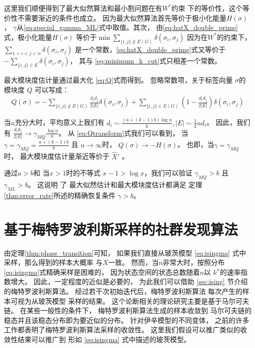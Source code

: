 这里我们顺便得到了最大似然算法和最小割问题在有$W^*$约束
下的等价性，这个等价性不需要渐近的条件也成立。
因为最大似然算法首先等价于极小化能量$H(\sigma)$，
$\gamma$从\eqref{eq:special_gamma_ML}式中取值。其次，
由\eqref{eq:hatX_double_prime}式，极小化能量$H(\sigma)$
等价于$\min \sum_{\{i,j\} \not\in E(G) } \delta(\sigma_i, \sigma_j)$
因为在$W^*$的约束下，
$\sum_{1<i<j<n} \delta(\sigma_i, \sigma_j)$
是一个常数，\eqref{eq:hatX_double_prime}式又等价于
$-\sum_{ \{i,j\} \in E} \delta(\sigma_i, \sigma_j)$，
其与 \eqref{eq:minimum_k_cut}式只相差一个常数。


最大模块度估计量通过最大化 \ref{eq:Q}式而得到。
忽略常数项，关于标签向量 $\sigma$的模块度 $Q$
可以写成：
\begin{align}
Q(\sigma) = -\sum_{\{i,j\} \not\in E(G) } \frac{d_i d_j}{2 |E|}\delta(\sigma_i,\sigma_j) 
+ \sum_{\{i,j\} \in E(G) } (1 - \frac{d_i d_j}{2 |E|}) \delta(\sigma_i,\sigma_j)  \label{eq:Qtransform}
\end{align}

当$n$充分大时，平均意义上我们有 $d_i \sim  \frac{(a+(k-1)b)\log n}{k}, |E| \sim \frac{1}{2}n d_i$。
因此，我们有
$\frac{d_id_j}{2|E|} \to \gamma_{MQ} \frac{\log n}{n} $。
从 \eqref{eq:Qtransform}式我们可以看到，
当 $\gamma = \gamma_{MQ} = \frac{a+(k-1)b}{k}$ 且 $n\to \infty$时，
$Q(\sigma) \to -H(\sigma)$。
也即，当$\gamma = \gamma_{MQ}$ 时，
最大模块度估计量渐近等价于
$\hat{X}'$ 。


通过$a>b$和 当$x>1$时的不等式 
 $x-1>\log x $，我们可以验证
  $\gamma_{MQ} >b$ 且  $\gamma_{ML} > b$。
  这说明 了
  最大似然估计和最大模块度估计都满足
  定理\ref{thm:error_rate}所述的精确恢复条件 $\gamma > b $。

\section{基于梅特罗波利斯采样的社群发现算法}\label{sec:ms}

由定理\ref{thm:phase_transition}可知，
如果我们直接从玻茨模型 \eqref{eq:isingma} 式中采样，那么得到的样本大概率
与$X$一致。
然而，当$n$非常大时，按照分布\eqref{eq:isingma}式精确采样是困难的，
因为状态空间的状态总数随着$n$以
$k^n$的速率指数增大。
因此，一定程度的近似是必要的，
为此我们可以借助 \ref{sec:ising} 节介绍的梅特罗波利斯算法。 
经过若干次初始迭代后，梅特罗波利斯算法
每次产生的样本可视为从玻茨模型 采样的结果。
这个论断相关的理论研究主要是基于马尔可夫链。
在某些一般性的条件下，
梅特罗波利斯算法生成的样本收敛到
马尔可夫链的稳态并且该稳态分布即为要近似的分布。
针对伊辛模型的不同变体，
之前的许多工作都表明了梅特罗波利斯算法采样的收敛性\cite{diaconis1998we}。
这里我们假设可以推广类似的收敛性结果可以推广到
形如 \eqref{eq:isingma} 式中描述的玻茨模型。

